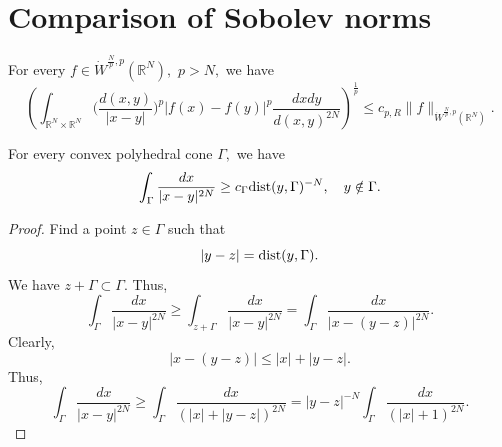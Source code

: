 \documentclass{amsart}
\numberwithin{equation}{section}
\begin{document}
\section{Comparison of Sobolev norms}\label{comparison section}

\begin{theorem}\label{sobolev comparison theorem} For every $f\in\dot{W}^{\frac{N}{p},p}(\mathbb{R}^N),$ $p>N,$ we have
$$\left(\int_{\mathbb{R}^N\times\mathbb{R}^N}\Big(\frac{d(x,y)}{|x-y|}\Big)^p|f(x)-f(y)|^p \frac{dxdy}{d(x,y)^{2N}}\right)^{\frac1p}\leq c_{p,R}\|f\|_{\dot{W}^{\frac{N}{p},p}(\mathbb{R}^N)}.$$
\end{theorem}

\begin{lemma}\label{s4 first compute lemma} For every convex polyhedral cone $\Gamma,$ we have
$$\int_{\Gamma}\frac{dx}{|x-y|^{2N}}\geq c_{\Gamma}{\rm dist}(y,\Gamma)^{-N},\quad y\notin\Gamma.$$
\end{lemma}
\begin{proof} Find a point $z\in\Gamma$ such that
$$|y-z|={\rm dist}(y,\Gamma).$$
We have $z+\Gamma\subset\Gamma.$ Thus,
$$\int_{\Gamma}\frac{dx}{|x-y|^{2N}}\geq \int_{z+\Gamma}\frac{dx}{|x-y|^{2N}}=\int_{\Gamma}\frac{dx}{|x-(y-z)|^{2N}}.$$
Clearly,
$$|x-(y-z)|\leq |x|+|y-z|.$$
Thus,
$$\int_{\Gamma}\frac{dx}{|x-y|^{2N}}\geq\int_{\Gamma}\frac{dx}{(|x|+|y-z|)^{2N}}=|y-z|^{-N}\int_{\Gamma}\frac{dx}{(|x|+1)^{2N}}.$$
\end{proof}
\end{document}
